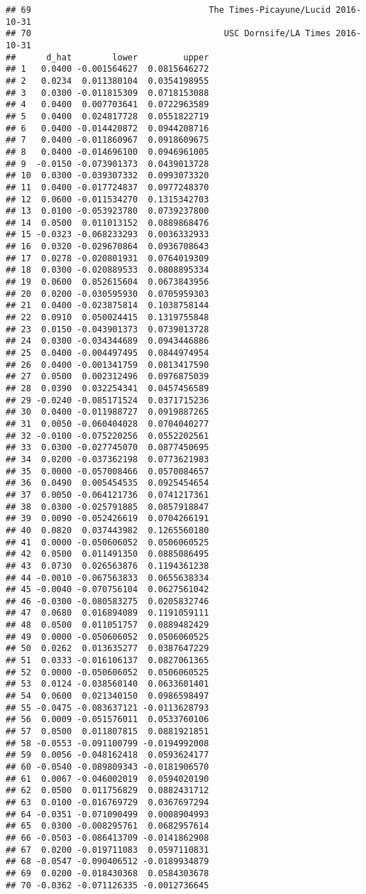 \documentclass[]{article}
\begin{document}
\begin{verbatim}
## 69                                   The Times-Picayune/Lucid 2016-10-31
## 70                                      USC Dornsife/LA Times 2016-10-31
##      d_hat        lower         upper
## 1   0.0400 -0.001564627  0.0815646272
## 2   0.0234  0.011380104  0.0354198955
## 3   0.0300 -0.011815309  0.0718153088
## 4   0.0400  0.007703641  0.0722963589
## 5   0.0400  0.024817728  0.0551822719
## 6   0.0400 -0.014420872  0.0944208716
## 7   0.0400 -0.011860967  0.0918609675
## 8   0.0400 -0.014696100  0.0946961005
## 9  -0.0150 -0.073901373  0.0439013728
## 10  0.0300 -0.039307332  0.0993073320
## 11  0.0400 -0.017724837  0.0977248370
## 12  0.0600 -0.011534270  0.1315342703
## 13  0.0100 -0.053923780  0.0739237800
## 14  0.0500  0.011013152  0.0889868476
## 15 -0.0323 -0.068233293  0.0036332933
## 16  0.0320 -0.029670864  0.0936708643
## 17  0.0278 -0.020801931  0.0764019309
## 18  0.0300 -0.020889533  0.0808895334
## 19  0.0600  0.052615604  0.0673843956
## 20  0.0200 -0.030595930  0.0705959303
## 21  0.0400 -0.023875814  0.1038758144
## 22  0.0910  0.050024415  0.1319755848
## 23  0.0150 -0.043901373  0.0739013728
## 24  0.0300 -0.034344689  0.0943446886
## 25  0.0400 -0.004497495  0.0844974954
## 26  0.0400 -0.001341759  0.0813417590
## 27  0.0500  0.002312496  0.0976875039
## 28  0.0390  0.032254341  0.0457456589
## 29 -0.0240 -0.085171524  0.0371715236
## 30  0.0400 -0.011988727  0.0919887265
## 31  0.0050 -0.060404028  0.0704040277
## 32 -0.0100 -0.075220256  0.0552202561
## 33  0.0300 -0.027745070  0.0877450695
## 34  0.0200 -0.037362198  0.0773621983
## 35  0.0000 -0.057008466  0.0570084657
## 36  0.0490  0.005454535  0.0925454654
## 37  0.0050 -0.064121736  0.0741217361
## 38  0.0300 -0.025791885  0.0857918847
## 39  0.0090 -0.052426619  0.0704266191
## 40  0.0820  0.037443982  0.1265560180
## 41  0.0000 -0.050606052  0.0506060525
## 42  0.0500  0.011491350  0.0885086495
## 43  0.0730  0.026563876  0.1194361238
## 44 -0.0010 -0.067563833  0.0655638334
## 45 -0.0040 -0.070756104  0.0627561042
## 46 -0.0300 -0.080583275  0.0205832746
## 47  0.0680  0.016894089  0.1191059111
## 48  0.0500  0.011051757  0.0889482429
## 49  0.0000 -0.050606052  0.0506060525
## 50  0.0262  0.013635277  0.0387647229
## 51  0.0333 -0.016106137  0.0827061365
## 52  0.0000 -0.050606052  0.0506060525
## 53  0.0124 -0.038560140  0.0633601401
## 54  0.0600  0.021340150  0.0986598497
## 55 -0.0475 -0.083637121 -0.0113628793
## 56  0.0009 -0.051576011  0.0533760106
## 57  0.0500  0.011807815  0.0881921851
## 58 -0.0553 -0.091100799 -0.0194992008
## 59  0.0056 -0.048162418  0.0593624177
## 60 -0.0540 -0.089809343 -0.0181906570
## 61  0.0067 -0.046002019  0.0594020190
## 62  0.0500  0.011756829  0.0882431712
## 63  0.0100 -0.016769729  0.0367697294
## 64 -0.0351 -0.071090499  0.0008904993
## 65  0.0300 -0.008295761  0.0682957614
## 66 -0.0503 -0.086413709 -0.0141862908
## 67  0.0200 -0.019711083  0.0597110831
## 68 -0.0547 -0.090406512 -0.0189934879
## 69  0.0200 -0.018430368  0.0584303678
## 70 -0.0362 -0.071126335 -0.0012736645
\end{verbatim}
\end{document}
